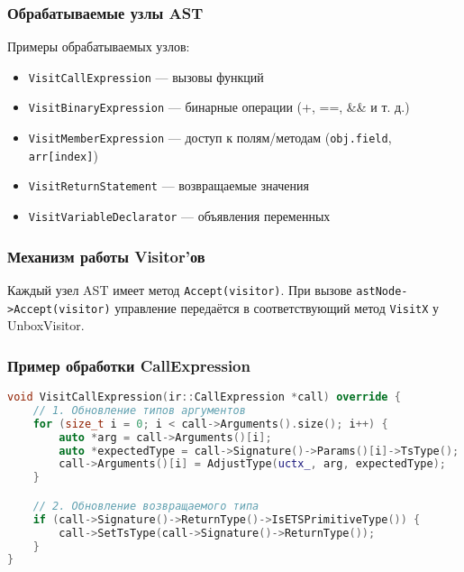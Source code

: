 \subsubsection{Обрабатываемые узлы AST}
Примеры обрабатываемых узлов:
\begin{itemize}
    \item \texttt{VisitCallExpression} — вызовы функций
    \item \texttt{VisitBinaryExpression} — бинарные операции (+, ==, \&\& и т. д.)
    \item \texttt{VisitMemberExpression} — доступ к полям/методам (\texttt{obj.field}, \texttt{arr[index]})
    \item \texttt{VisitReturnStatement} — возвращаемые значения
    \item \texttt{VisitVariableDeclarator} — объявления переменных
\end{itemize}

\subsubsection{Механизм работы Visitor'ов}

Каждый узел AST имеет метод \texttt{Accept(visitor)}.
При вызове \texttt{astNode->Accept(visitor)} управление передаётся в соответствующий метод \texttt{VisitX} у UnboxVisitor.

\subsubsection{Пример обработки CallExpression}
\begin{lstlisting}[language=C++,caption=Обработка вызовов функций]
void VisitCallExpression(ir::CallExpression *call) override {
    // 1. Обновление типов аргументов
    for (size_t i = 0; i < call->Arguments().size(); i++) {
        auto *arg = call->Arguments()[i];
        auto *expectedType = call->Signature()->Params()[i]->TsType();
        call->Arguments()[i] = AdjustType(uctx_, arg, expectedType);
    }

    // 2. Обновление возвращаемого типа
    if (call->Signature()->ReturnType()->IsETSPrimitiveType()) {
        call->SetTsType(call->Signature()->ReturnType());
    }
}
\end{lstlisting}


